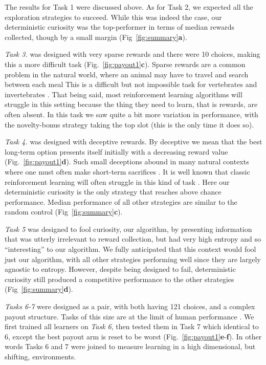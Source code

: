 The results for Task 1 were discussed above. As for Task 2, we expected all the exploration strategies to succeed. While this was indeed the case, our deterministic curiosity was the top-performer in terms of median rewards collected, though by a small margin (Fig~\ref{fig:summary}\textbf{a}).

\textit{Task 3.} was designed with very sparse rewards \citep{Mniha,Silver2016b,Silver2018} and there were 10 choices, making this a more difficult task (Fig.~\ref{fig:payout1}\textbf{c}). Sparse rewards are a common problem in the natural world, where an animal may have to travel and search between each meal This is a difficult but not impossible task for vertebrates \citep{anderson1984optimal} and invertebrates \citep{westphal2006foraging}. That being said, most reinforcement learning algorithms will struggle in this setting because the thing they need to learn, that is rewards, are often absent. In this task we saw quite a bit more variation in performance, with the novelty-bonus strategy taking the top slot (this is the only time it does so).

\textit{Task 4.} was designed with deceptive rewards. By deceptive we mean that the best long-term option presents itself initially with a decreasing reward value (Fig.~\ref{fig:payout1}\textbf{d}). Such small deceptions abound in many natural contexts where one must often make short-term sacrifices \citep{internicola2012bumble}. It is well known that classic reinforcement learning will often struggle in this kind of task \citep{Lehman2011a,Sutton2018}. Here our deterministic curiosity is the only strategy that reaches above chance performance. Median performance of all other strategies are similar to the random control (Fig~\ref{fig:summary}\textbf{c}). 

\textit{Task 5} was designed to fool curiosity, our algorithm, by presenting information that was utterly irrelevant to reward collection, but had very high entropy and so ``interesting'' to our algorithm. We fully anticipated that this context would fool just our algorithm, with all other strategies performing well since they are largely agnostic to entropy. However, despite being designed to fail, deterministic curiosity still produced a competitive performance to the other strategies (Fig~\ref{fig:summary}\textbf{d}). 

\textit{Tasks 6-7} were designed as a pair, with both having 121 choices, and a complex payout structure. Tasks of this size are at the limit of human performance \citep{Wu2018}. We first trained all learners on \textit{Task 6}, then tested them in Task 7 which identical to 6, except the best payout arm is reset to be worst (Fig.~\ref{fig:payout1}\textbf{e}-\textbf{f}). In other words Tasks 6 and 7 were joined to measure learning in a high dimensional, but shifting, environments.

